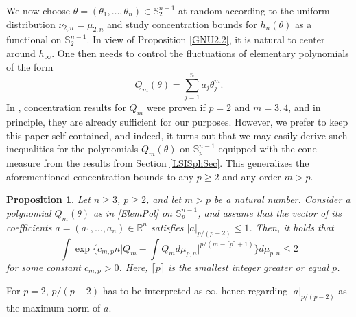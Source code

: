 \documentclass[a4paper,12pt]{amsart}
\numberwithin{equation}{section}
\newtheorem{proposition}[satz]{Proposition}
\theoremstyle{remark}
\def\R{{\mathbb R}}
\def\S{{\mathbb S}}
\begin{document}
We now choose $\theta = (\theta_1, \ldots, \theta_n) \in \S_2^{n-1}$ at random according to the uniform distribution $\nu_{2,n} = \mu_{2,n}$ and study concentration bounds for $h_n(\theta)$ as a functional on $\S_2^{n-1}$. In view of Proposition \ref{GNU2.2}, it is natural to center around $h_\infty$. One then needs to control the fluctuations of elementary polynomials of the form
\begin{equation}\label{ElemPol}
Q_m(\theta) = \sum_{j=1}^n a_j \theta_j^m.
\end{equation}
In \cite[Ch.\ 10.6\&10.7]{BCG23}, concentration results for $Q_m$ were proven if $p=2$ and $m=3,4$, and in principle, they are already sufficient for our purposes. However, we prefer to keep this paper self-contained, and indeed, it turns out that we may easily derive such inequalities for the polynomials $Q_m(\theta)$ on $\S_p^{n-1}$ equipped with the cone measure from the results from Section \ref{LSISphSec}. This generalizes the aforementioned concentration bounds to any $p \ge 2$ and any order $m > p$.

\begin{proposition}\label{DevElemPolS2}
	Let $n \ge 3$, $p \ge 2$, and let $m > p$ be a natural number. Consider a polynomial $Q_m(\theta)$ as in \eqref{ElemPol} on $\S_p^{n-1}$, and assume that the vector of its coefficients $a=(a_1, \ldots, a_n) \in \R^n$ satisfies $|a|_{p/(p-2)} \le 1$. Then, it holds that
	\[
	\int \exp\Big\{c_{m,p} n\Big|Q_m - \int Q_md\mu_{p,n}\Big|^{p/(m-\lceil p \rceil +1)}\Big\} d\mu_{p,n} \le 2
	\]
	for some constant $c_{m,p} > 0$. Here, $\lceil p \rceil$ is the smallest integer greater or equal $p$.
\end{proposition}

For $p=2$, $p/(p-2)$ has to be interpreted as $\infty$, hence regarding $|a|_{p/(p-2)}$ as the maximum norm of $a$.
\end{document}
